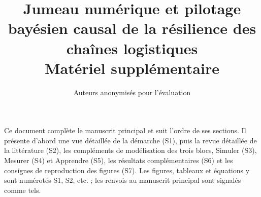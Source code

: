 \documentclass[11pt,a4paper]{article}
\title{Jumeau numérique et pilotage bayésien causal de la résilience des chaînes logistiques\\[4pt]
\large Matériel supplémentaire}
\author{Auteurs anonymisés pour l'évaluation}
\date{}
\begin{document}
\maketitle

\noindent Ce document complète le manuscrit principal et suit l'ordre de ses sections. Il présente d'abord une vue détaillée de la démarche (S1), puis la revue détaillée de la littérature (S2), les compléments de modélisation des trois blocs, Simuler (S3), Mesurer (S4) et Apprendre (S5), les résultats complémentaires (S6) et les consignes de reproduction des figures (S7). Les figures, tableaux et équations y sont numérotés S1, S2, etc. ; les renvois au manuscrit principal sont signalés comme tels.

\tableofcontents











\end{document}
